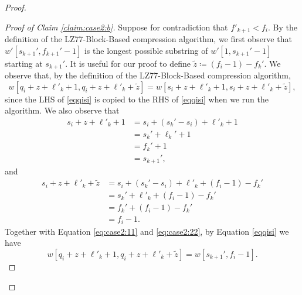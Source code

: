 \begin{proof}
\begin{enumerate}
\begin{proof}[Proof of Claim 
    \ref{claim:case2:b}]
Suppose for contradiction that \( f'_{k + 1} < f_i \). 
By the definition of the LZ77-Block-Based compression algorithm, we first observe that $w'[s_{k+1}',f_{k+1}'-1]$ is the longest possible substring of $w'[1,s_{k+1}'-1]$ starting at $s_{k+1}'$. 
It is useful for our proof to define $\tilde{z} \coloneqq (f_i-1)-f_k'$. We observe that, by the definition of the LZ77-Block-Based compression algorithm, 
\begin{equation}\label{eqqisi}
    w[q_i + z + \ell'_k + 1, q_i + z + \ell'_k + \tilde{z}] = w[s_i + z + \ell'_k + 1, s_i + z + \ell'_k + \tilde{z}],    
\end{equation}
since the LHS of \eqref{eqqisi} is copied to the RHS of \eqref{eqqisi} when we run the algorithm. We also observe that
\begin{align}\label{eq:case2:11}
    s_i + z + \ell'_k + 1 &= s_i + (s_k'-s_i) + \ell'_k + 1 \nonumber\\
    &= s_k' + \ell_k' + 1 \nonumber \\
    &= f_k'+1 \nonumber \\
    &= s_{k+1}',
\end{align}
and
\begin{align}\label{eq:case2:22}
    s_i + z + \ell'_k + \tilde{z} &= s_i + (s_k'-s_i) + \ell'_k + (f_i-1)-f_k' \nonumber\\
    &= s_k' + \ell'_k + (f_i-1) - f_k'\nonumber \\
    &= f_k' + (f_i-1) - f_k' \nonumber\\
    &= f_i - 1.
\end{align}
Together with Equation \eqref{eq:case2:11} and \eqref{eq:case2:22}, by Equation \eqref{eqqisi} we have
\begin{equation}\label{c}
    w[q_i + z + \ell'_k + 1, q_i + z + \ell'_k + \tilde{z}] = w[s_{k+1}', f_i-1].
\end{equation}




\end{proof}
\end{enumerate}
\end{proof}
